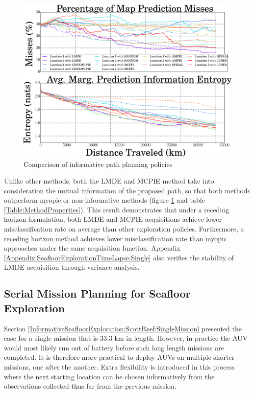 			\begin{figure}[!htbp]
			\centering
				\includegraphics[width = 0.8\linewidth]{Figures/compare_methods.eps}
			\caption{Comparison of informative path planning policies}
			\label{Figure:CompareMethods}
			\end{figure}
				
			Unlike other methods, both the LMDE and MCPIE method take into consideration the mutual information of the proposed path, so that both methods outperform myopic or non-informative methods (figure \ref{Figure:CompareMethods} and table \ref{Table:MethodProperties}). This result demonstrates that under a receding horizon formulation, both LMDE and MCPIE acquisitions achieve lower misclassification rate on average than other exploration policies. Furthermore, a receding horizon method achieves lower misclassification rate than myopic approaches under the same acquisition function. Appendix \ref{Appendix:SeafloorExplorationTimeLapse:Single} also verifies the stability of LMDE acquisition through variance analysis.
				
		\subsection{Serial Mission Planning for Seafloor Exploration}
		\label{InformativeSeafloorExploration:ScottReef:SerialMission}
			
			Section \ref{InformativeSeafloorExploration:ScottReef:SingleMission} presented the case for a single mission that is 33.3 km in length. However, in practice the AUV would most likely run out of battery before such long length missions are completed. It is therefore more practical to deploy AUVs on multiple shorter missions, one after the another. Extra flexibility is introduced in this process where the next starting location can be chosen informatively from the observations collected thus far from the previous mission.
			
